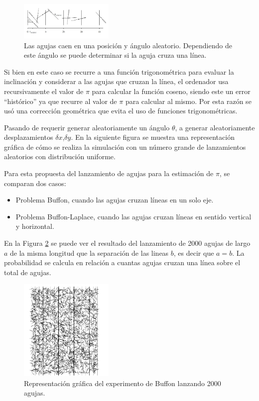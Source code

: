 \documentclass{rbf}
\begin{document}
\begin{figure}[tbp!]
 \centering
  \includegraphics[width=0.4\textwidth]{figures/agujas.jpg}
	\caption{Las agujas caen en una posición y ángulo aleatorio. Dependiendo de este ángulo se puede determinar si la aguja cruza una línea.\cite{krauth}}
 \label{aguja}
\end{figure}

Si bien en este caso se recurre a una función trigonométrica para evaluar la inclinación y considerar a las agujas que cruzan la línea, el ordenador usa recursivamente el valor de $\pi$ para calcular la función coseno, siendo este un error “histórico” ya que recurre al valor de $\pi$ para calcular al mismo. Por esta razón se usó una corrección geométrica que evita el uso de funciones trigonométricas.

Pasando de requerir generar aleatoriamente un ángulo $\theta$, a generar aleatoriamente desplazamientos $\delta x$,$\delta y$. En la siguiente figura se muestra una representación gráfica de cómo se realiza la simulación con un número grande de lanzamientos aleatorios con distribución uniforme. \cite{krauth}

Para esta propuesta del lanzamiento de agujas para la estimación de $\pi$, se comparan dos casos:

\begin{itemize}
    \item Problema Buffon, cuando las agujas cruzan líneas en un solo eje.
    \item Problema Buffon-Laplace, cuando las agujas cruzan líneas en sentido vertical y horizontal.
\end{itemize}



En la Figura \ref{buff} se puede ver el resultado del lanzamiento de 2000 agujas de largo $a$ de la misma longitud que la separación de las lineas $b$, es decir que $a=b$. La probabilidad se calcula en relación a cuantas agujas cruzan una línea sobre el total de agujas. 

\begin{figure}[tbp!]
 \centering
  \includegraphics[width=0.4\textwidth]{figures/buffon.jpg}
    \caption{Representación gráfica del experimento de Buffon lanzando 2000 agujas.\cite{krauth}}
 \label{buff}
\end{figure}
\end{document}

